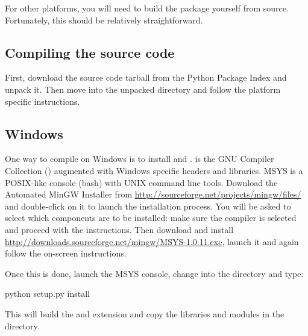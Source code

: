 \documentclass[]{jss}
\begin{document}
For other platforms, you will need to build the package yourself from source.
Fortunately, this should be relatively straightforward.



\subsection{Compiling the source code}
  \label{compiling-the-source-code}%


First, download the source code tarball from the Python Package Index and unpack it. Then move
into the unpacked directory and follow the platform specific instructions.



\subsection{Windows}
  \label{windows}%


One way to compile  on Windows is to install  \citep{mingw} and .  is
the GNU Compiler Collection () augmented with Windows specific headers and
libraries. MSYS is a POSIX-like console (bash) with UNIX command line tools.
Download the Automated MinGW Installer from \href{http://sourceforge.net/projects/mingw/files/}{http://sourceforge.net/projects/mingw/files/} and double-click on it to launch
the installation process. You will be asked to select which
components are to be installed: make sure the  \citep{gcc} compiler is selected and
proceed with the instructions. Then download and install \href{http://downloads.sourceforge.net/mingw/MSYS-1.0.11.exe}{http://downloads.sourceforge.net/mingw/MSYS-1.0.11.exe},
launch it and again follow the on-screen instructions.

Once this is done, launch the MSYS console, change into the  directory and
type:
\begin{CodeInput}
python setup.py install
\end{CodeInput}

This will build the  and  extension and copy the libraries and  
modules in the  directory.


\end{document}
